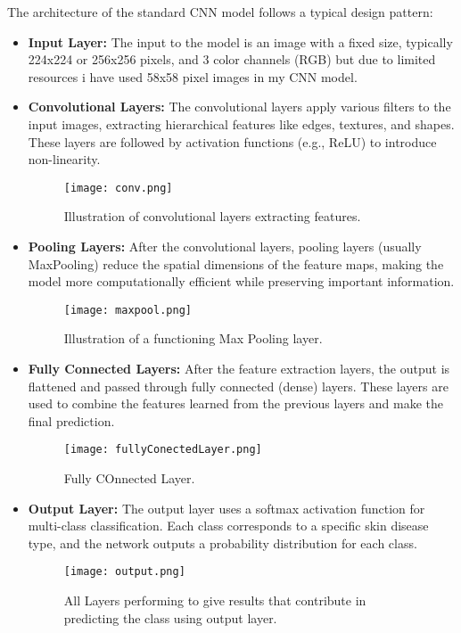 \documentclass{article}
\begin{document}
The architecture of the standard CNN model follows a typical design pattern:
\begin{itemize}
    \item \textbf{Input Layer:} The input to the model is an image with a fixed size, typically 224x224 or 256x256 pixels, and 3 color channels (RGB) but due to limited resources i have used 58x58 pixel images in my CNN model.
    \item \textbf{Convolutional Layers:} The convolutional layers apply various filters to the input images, extracting hierarchical features like edges, textures, and shapes. These layers are followed by activation functions (e.g., ReLU) to introduce non-linearity.
    \begin{figure}[H]
    \centering
    \texttt{[image: conv.png]}
    \caption{Illustration of convolutional layers extracting features.}
    \label{fig:conv_layer}
\end{figure}

    \item \textbf{Pooling Layers:} After the convolutional layers, pooling layers (usually MaxPooling) reduce the spatial dimensions of the feature maps, making the model more computationally efficient while preserving important information.  \begin{figure}[h]
    \centering
    \texttt{[image: maxpool.png]}
    \caption{Illustration of a functioning Max Pooling layer.}
    \label{fig:conv_layer}
\end{figure}

    
    \item \textbf{Fully Connected Layers:} After the feature extraction layers, the output is flattened and passed through fully connected (dense) layers. These layers are used to combine the features learned from the previous layers and make the final prediction.
      \begin{figure}[H]
    \centering
    \texttt{[image: fullyConectedLayer.png]}
    \caption{Fully COnnected Layer.}
    \label{fig:conv_layer}
\end{figure}

    \item \textbf{Output Layer:} The output layer uses a softmax activation function for multi-class classification. Each class corresponds to a specific skin disease type, and the network outputs a probability distribution for each class.
        \begin{figure}[H]
    \centering
    \texttt{[image: output.png]}
    \caption{All Layers  performing to give results that contribute in predicting the class using output layer.}
    \label{fig:conv_layer}
\end{figure}

\end{itemize}
\end{document}
